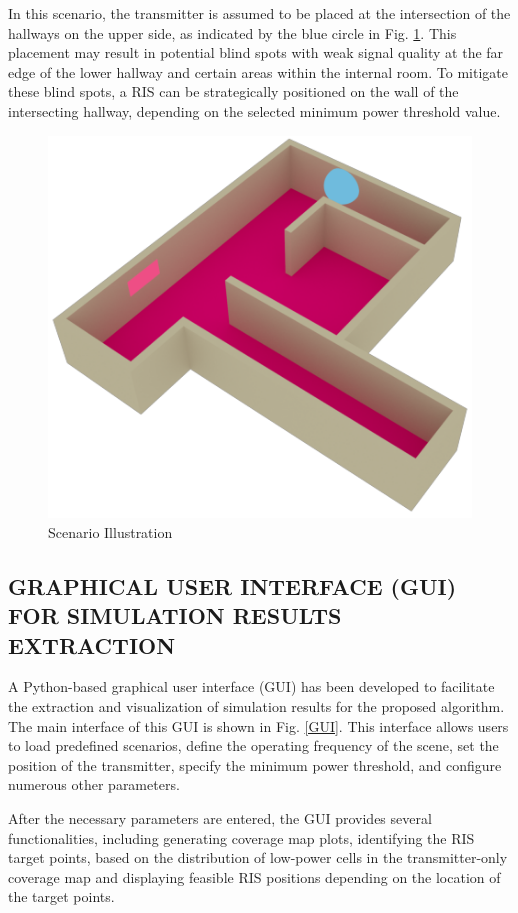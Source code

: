 \documentclass{IEEEoj}
\begin{document}
In this scenario, the transmitter is assumed to be placed at the intersection of the hallways on the upper side, as indicated by the blue circle in Fig. \ref{Scenario}. This placement may result in potential blind spots with weak signal quality at the far edge of the lower hallway and certain areas within the internal room. To mitigate these blind spots, a RIS can be strategically positioned on the wall of the intersecting hallway, depending on the selected minimum power threshold value.

\begin{figure}
	\centering \includegraphics[width=.8\linewidth]{Sim_Results/Scenario_Illustration.png}
	\caption{Scenario Illustration}
	\label{Scenario}
\end{figure}

\subsection{GRAPHICAL USER INTERFACE (GUI) FOR SIMULATION RESULTS EXTRACTION}
A Python-based graphical user interface (GUI) has been developed to facilitate the extraction and visualization of simulation results for the proposed algorithm. The main interface of this GUI is shown in Fig. \ref{GUI}. This interface allows users to load predefined scenarios, define the operating frequency of the scene, set the position of the transmitter, specify the minimum power threshold, and configure numerous other parameters.

After the necessary parameters are entered, the GUI provides several functionalities, including generating coverage map plots, identifying the RIS target points, based on the distribution of low-power cells in the transmitter-only coverage map and displaying feasible RIS positions depending on the location of the target points.
\end{document}
